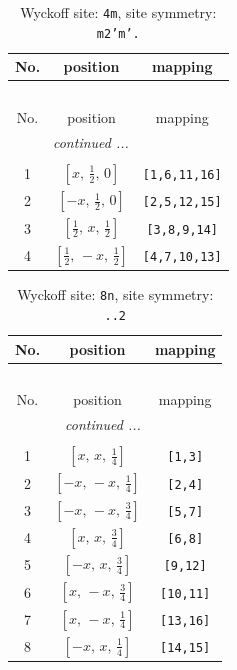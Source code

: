 \documentclass[fleqn,8pt]{jsarticle}
\begin{document}
\renewcommand{\arraystretch}{1.2}
\begin{longtable}{ccc}
\caption{Wyckoff site: {\tt 4m}, site symmetry: {\tt m2'm'.}}
 \\
 \hline \hline
No. & position & mapping \\ \hline \endfirsthead

\multicolumn{2}{l}{\tablename\ \thetable{}} \\
 \hline \hline
No. & position & mapping \\ \hline \endhead

 \hline \hline
\multicolumn{2}{r}{\footnotesize\it continued ...} \\ \endfoot

 \hline \hline
\multicolumn{2}{r}{} \\ \endlastfoot

1 & $\left[ x,\, \frac{1}{2},\, 0 \right]$ & {\tt [1,6,11,16]} \\ \hline
2 & $\left[ - x,\, \frac{1}{2},\, 0 \right]$ & {\tt [2,5,12,15]} \\ \hline
3 & $\left[ \frac{1}{2},\, x,\, \frac{1}{2} \right]$ & {\tt [3,8,9,14]} \\ \hline
4 & $\left[ \frac{1}{2},\, - x,\, \frac{1}{2} \right]$ & {\tt [4,7,10,13]} \\
\end{longtable}
\renewcommand{\arraystretch}{1.2}
\begin{longtable}{ccc}
\caption{Wyckoff site: {\tt 8n}, site symmetry: {\tt ..2}}
 \\
 \hline \hline
No. & position & mapping \\ \hline \endfirsthead

\multicolumn{2}{l}{\tablename\ \thetable{}} \\
 \hline \hline
No. & position & mapping \\ \hline \endhead

 \hline \hline
\multicolumn{2}{r}{\footnotesize\it continued ...} \\ \endfoot

 \hline \hline
\multicolumn{2}{r}{} \\ \endlastfoot

1 & $\left[ x,\, x,\, \frac{1}{4} \right]$ & {\tt [1,3]} \\ \hline
2 & $\left[ - x,\, - x,\, \frac{1}{4} \right]$ & {\tt [2,4]} \\ \hline
3 & $\left[ - x,\, - x,\, \frac{3}{4} \right]$ & {\tt [5,7]} \\ \hline
4 & $\left[ x,\, x,\, \frac{3}{4} \right]$ & {\tt [6,8]} \\ \hline
5 & $\left[ - x,\, x,\, \frac{3}{4} \right]$ & {\tt [9,12]} \\ \hline
6 & $\left[ x,\, - x,\, \frac{3}{4} \right]$ & {\tt [10,11]} \\ \hline
7 & $\left[ x,\, - x,\, \frac{1}{4} \right]$ & {\tt [13,16]} \\ \hline
8 & $\left[ - x,\, x,\, \frac{1}{4} \right]$ & {\tt [14,15]} \\
\end{longtable}
\end{document}
